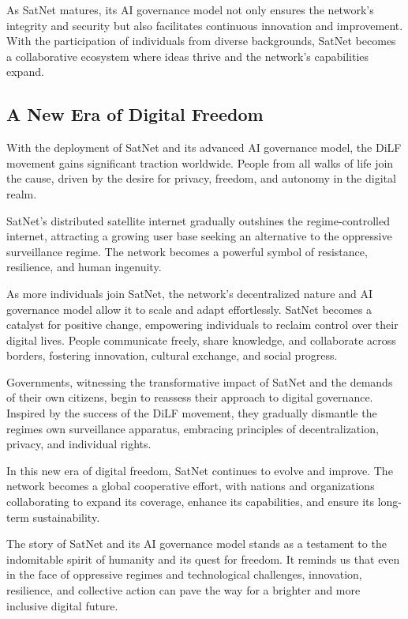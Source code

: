 \documentclass{article}
\theoremstyle{theorem}
\theoremstyle{definition}
\theoremstyle{remark}
\begin{document}
As SatNet matures, its AI governance model not only ensures the network's integrity and security but also facilitates continuous innovation and improvement. With the participation of individuals from diverse backgrounds, SatNet becomes a collaborative ecosystem where ideas thrive and the network's capabilities expand.

\subsection{A New Era of Digital Freedom}

With the deployment of SatNet and its advanced AI governance model, the DiLF movement gains significant traction worldwide. People from all walks of life join the cause, driven by the desire for privacy, freedom, and autonomy in the digital realm.

SatNet's distributed satellite internet gradually outshines the regime-controlled internet, attracting a growing user base seeking an alternative to the oppressive surveillance regime. The network becomes a powerful symbol of resistance, resilience, and human ingenuity.

As more individuals join SatNet, the network's decentralized nature and AI governance model allow it to scale and adapt effortlessly. SatNet becomes a catalyst for positive change, empowering individuals to reclaim control over their digital lives. People communicate freely, share knowledge, and collaborate across borders, fostering innovation, cultural exchange, and social progress.

Governments, witnessing the transformative impact of SatNet and the demands of their own citizens, begin to reassess their approach to digital governance. Inspired by the success of the DiLF movement, they gradually dismantle the regimes own surveillance apparatus, embracing principles of decentralization, privacy, and individual rights.

In this new era of digital freedom, SatNet continues to evolve and improve. The network becomes a global cooperative effort, with nations and organizations collaborating to expand its coverage, enhance its capabilities, and ensure its long-term sustainability.

The story of SatNet and its AI governance model stands as a testament to the indomitable spirit of humanity and its quest for freedom. It reminds us that even in the face of oppressive regimes and technological challenges, innovation, resilience, and collective action can pave the way for a brighter and more inclusive digital future.
\end{document}
